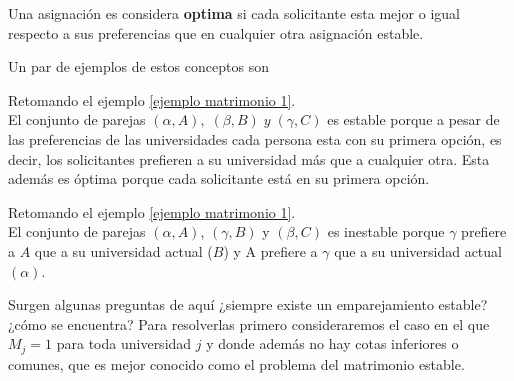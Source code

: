 \begin{dfn}{\cite{GaleShapley}}
\label{optima}
Una asignación es considera \textbf{optima} si cada solicitante esta mejor o igual respecto a sus preferencias que en cualquier otra asignación estable. 
\end{dfn}

Un par de ejemplos de estos conceptos son 

\begin{eje}
Retomando el ejemplo \ref{ejemplo matrimonio 1}. \\
El conjunto de parejas $(\alpha, A), \; (\beta, B)\; y\; (\gamma, C)$ es estable porque a pesar de las preferencias de las universidades cada persona esta con su primera opción, es decir, los solicitantes prefieren a su universidad más que a cualquier otra. Esta además es óptima porque cada solicitante está en su primera opción.
\fin
\end{eje}
\begin{eje}
Retomando el ejemplo \ref{ejemplo matrimonio 1}. \\
El conjunto de parejas $(\alpha, A)$, $(\gamma, B)$ y $(\beta, C)$ es inestable porque $\gamma$ prefiere a $A$ que a su universidad actual ($B$) y A prefiere a $\gamma$ que a su universidad actual $(\alpha)$.
\fin
\end{eje}


Surgen algunas preguntas de aquí ¿siempre existe un emparejamiento estable? ¿cómo se encuentra? Para resolverlas primero consideraremos el caso en el que $M_j=1$ para toda universidad $j$ y donde además no hay cotas inferiores o comunes, que es mejor conocido como el problema del matrimonio estable. 



